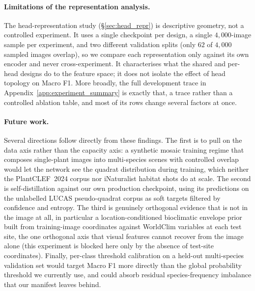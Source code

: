 \paragraph{Limitations of the representation analysis.} The head-representation study
(\S\ref{sec:head_repr}) is descriptive geometry, not a controlled experiment. It uses a single
checkpoint per design, a single $4{,}000$-image sample per experiment, and two different
validation splits (only $62$ of $4{,}000$ sampled images overlap), so we compare each
representation only against its own encoder and never cross-experiment. It characterises what the
shared and per-head designs do to the feature space; it does not isolate the effect of head
topology on Macro F1. More broadly, the full development trace in
Appendix~\ref{app:experiment_summary} is exactly that, a trace rather than a controlled
ablation table, and most of its rows change several factors at once.

\paragraph{Future work.} Several directions follow directly from these findings. The first is to
pull on the data axis rather than the capacity axis: a synthetic mosaic training regime that
composes single-plant images into multi-species scenes with controlled overlap would let the
network see the quadrat distribution during training, which neither the PlantCLEF~2024 corpus nor
iNaturalist habitat shots do at scale. The second is self-distillation against our own production
checkpoint, using its predictions on the unlabelled LUCAS pseudo-quadrat corpus as soft targets
filtered by confidence and entropy. The third is genuinely orthogonal evidence that is not in the
image at all, in particular a location-conditioned bioclimatic envelope prior built from
training-image coordinates against WorldClim variables at each test site, the one orthogonal axis
that visual features cannot recover from the image alone (this experiment is blocked here only by
the absence of test-site coordinates). Finally, per-class threshold calibration on a held-out
multi-species validation set would target Macro F1 more directly than the global probability
threshold we currently use, and could absorb residual species-frequency imbalance that our
manifest leaves behind.
